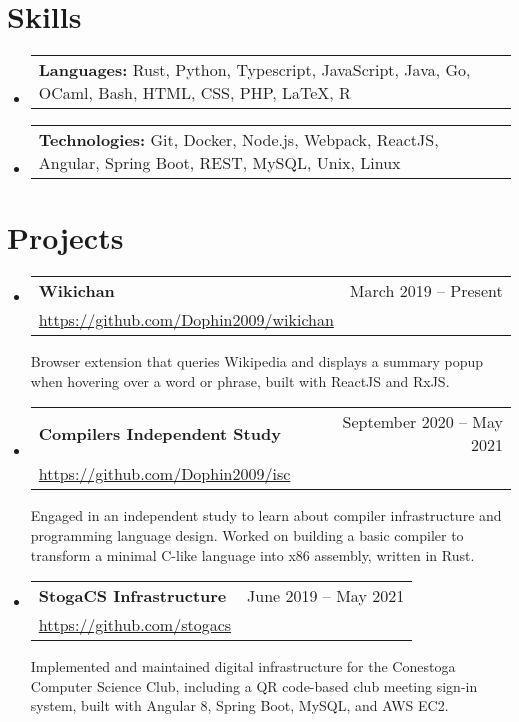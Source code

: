 \documentclass[letterpaper,11pt]{article}
\makeatletter
\newcommand{\resumeSubheading}[4]{
  \vspace{-2pt}\item
    \begin{tabular*}{0.97\textwidth}[t]{l@{\extracolsep{\fill}}r}
      \textbf{#1} & #2 \\
      {#3} & {\small #4} \\[3pt]
    \end{tabular*}\vspace{-5pt}
}
\newcommand{\resumeSubheadingDescription}[1]{
  \parbox{0.97\textwidth}{#1}
}
\newcommand{\resumeSubSubSubheading}[2]{
  \vspace{3pt}
  \item \begin{tabular*}{0.97\textwidth}{l}
      \textbf{#1:} #2 \\
    \end{tabular*}\vspace{-8pt}
}
\newenvironment{resumeSubHeadingList}{
  \begin{itemize}[leftmargin=*, label={}]
}{
  \end{itemize}
}
\makeatother
\begin{document}
\section{Skills}
  \vspace*{-5pt}

  \begin{resumeSubHeadingList}
    \resumeSubSubSubheading{Languages}%
      {Rust, Python, Typescript, JavaScript, Java, Go, OCaml, Bash, HTML, CSS, PHP, LaTeX, R}
    \resumeSubSubSubheading{Technologies}%
      {Git, Docker, Node.js, Webpack, ReactJS, Angular, Spring Boot, REST, MySQL, Unix, Linux}
  \end{resumeSubHeadingList}

  \vspace*{0pt}

\section{Projects}

  \begin{resumeSubHeadingList}
    \resumeSubheading%
      {Wikichan}%
      {\small March 2019 -- Present}%
      {\small \url{https://github.com/Dophin2009/wikichan}}%
      {}

      \resumeSubheadingDescription{
        Browser extension that queries Wikipedia and displays a summary popup when hovering over a
        word or phrase, built with ReactJS and RxJS.
      }

    \resumeSubheading%
      {Compilers Independent Study}%
      {\small September 2020 -- May 2021}%
      {\small \url{https://github.com/Dophin2009/isc}}%
      {}

      \resumeSubheadingDescription{
        Engaged in an independent study to learn about compiler infrastructure and programming
        language design. Worked on building a basic compiler to transform a minimal C-like language
        into x86 assembly, written in Rust.
      }

    \resumeSubheading%
      {StogaCS Infrastructure}%
      {\small June 2019 -- May 2021}%
      {\small \url{https://github.com/stogacs}}%
      {}

      \resumeSubheadingDescription{
        Implemented and maintained digital infrastructure for the Conestoga Computer Science Club,
        including a QR code-based club meeting sign-in system, built with Angular 8, Spring Boot,
        MySQL, and AWS EC2.
      }
  \end{resumeSubHeadingList}
\end{document}
